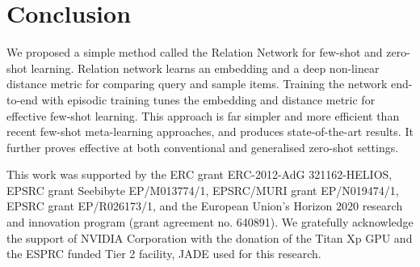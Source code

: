 \documentclass[10pt,twocolumn,letterpaper]{article}
\begin{document}
\section{Conclusion}
We proposed a simple method called the Relation Network for few-shot and zero-shot learning. Relation network learns an embedding and a deep non-linear distance metric for comparing query and sample items. Training the network end-to-end with episodic training tunes the embedding and distance metric for effective few-shot learning. This approach is far simpler and more efficient than recent few-shot meta-learning approaches, and produces state-of-the-art results. It further proves effective at both conventional and generalised zero-shot settings. 




This work was supported by the ERC grant ERC-2012-AdG 321162-HELIOS, EPSRC grant Seebibyte EP/M013774/1, EPSRC/MURI grant EP/N019474/1, EPSRC grant EP/R026173/1, and the European Union's Horizon 2020 research and innovation program (grant agreement no. 640891). We gratefully acknowledge the support of NVIDIA Corporation with the donation of the Titan Xp GPU and the ESPRC funded Tier 2 facility, JADE used for this research.
{\small


}
\end{document}
